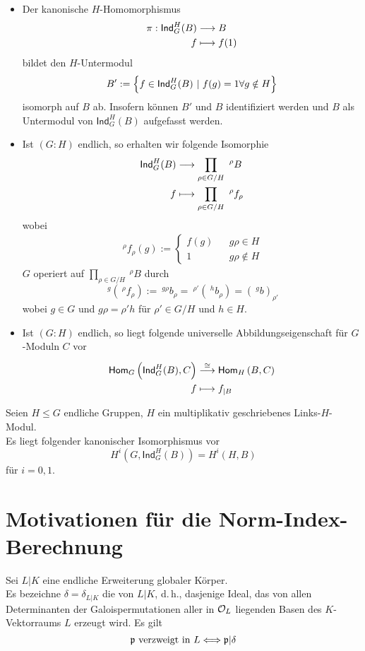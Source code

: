 \Bem{}
\begin{itemize}
\item Der kanonische $H$-Homomorphismus
\begin{align*}
\pi : \textsf{Ind}^H_G(B) & \overset{}{\longrightarrow} B\\
f & \longmapsto f(1)
\end{align*}
bildet den $H$-Untermodul
\[ B' := \set{f \in \textsf{Ind}_G^H(B)}{ f(g) = 1 \forall g \notin H } \]
isomorph auf $B$ ab. Insofern können $B'$ und $B$ identifiziert werden und $B$ als Untermodul von $\textsf{Ind}^H_G(B)$ aufgefasst werden.
\item Ist $(G:H)$ endlich, so erhalten wir folgende Isomorphie
\begin{align*}
\textsf{Ind}_G^H(B) &\overset{}{\longrightarrow} \prod_{\rho \in G/H} \ ^\rho B\\
f & \longmapsto \prod_{\rho \in G/H} \ ^\rho f_{\rho}
\end{align*}
wobei
\begin{align*}
\ ^\rho f_{\rho} (g) := \left\lbrace
\begin{aligned}
f(g) && g\rho \in H\\
1 && g\rho \notin H
\end{aligned}
\right.
\end{align*}
$G$ operiert auf $\prod_{\rho \in G/H} \ ^\rho B$ durch
\[ \ ^g(\ ^\rho f_{\rho}) := \ ^{g\rho}b_\rho = \ ^{\rho'}(\ ^{h}b_\rho) = (\ ^gb)_{\rho'} \]
wobei $g \in G$ und $g\rho = \rho' h$ für $\rho' \in G/H$ und $h \in H$.
\item Ist $(G:H)$ endlich, so liegt folgende universelle Abbildungseigenschaft für $G$-Moduln $C$ vor
\begin{align*}
\textsf{Hom}_{G}\left(\textsf{Ind}_G^H(B), C\right) &\overset{\overset{}{\cong}}{\longrightarrow} \textsf{Hom}_{H}\left(B, C\right)\\
f& \longmapsto f_{|B}
\end{align*}
\end{itemize}

\Satz{}
Seien $H\leq G$ endliche Gruppen, $H$ ein multiplikativ geschriebenes Links-$H$-Modul.\\
Es liegt folgender kanonischer Isomorphismus vor
\[ H^i(G, \textsf{Ind}_G^H(B)) = H^i(H,B) \]
für $i = 0,1$.

\section{Motivationen für die Norm-Index-Berechnung}
\Bem{}
Sei $L|K$ eine endliche Erweiterung globaler Körper.\\
Es bezeichne $\delta = \delta_{L|K}$ die  von $L|K$, d.\,h., dasjenige Ideal, das von allen Determinanten der Galoispermutationen aller in $\mathcal{O}_L$ liegenden Basen des $K$-Vektorraums $L$ erzeugt wird. Es gilt
\[ \mathfrak{p} \text{ verzweigt in }L \overset{}{\Longleftrightarrow} \mathfrak{p} | \delta \]

